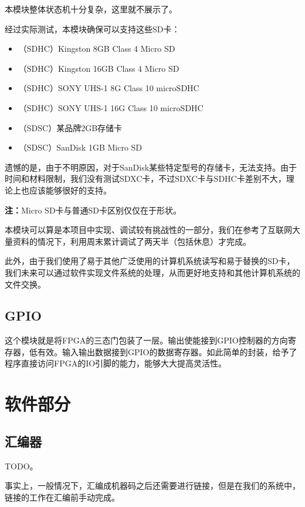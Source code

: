 \documentclass[11pt,utf8]{report}
\begin{document}
	\par 本模块整体状态机十分复杂，这里就不展示了。
	
	\par 经过实际测试，本模块确保可以支持这些SD卡：
	
	\begin{itemize}
		\item （SDHC）Kingston 8GB Class 4 Micro SD
		\item （SDHC）Kingston 16GB Class 4 Micro SD
		\item （SDHC）SONY UHS-1 8G Class 10 microSDHC
		\item （SDHC）SONY UHS-1 16G Class 10 microSDHC
		\item （SDSC）某品牌2GB存储卡
		\item （SDSC）SanDisk 1GB Micro SD
	\end{itemize}
	
	\par 遗憾的是，由于不明原因，对于SanDisk某些特定型号的存储卡，无法支持。由于时间和材料限制，我们没有测试SDXC卡，不过SDXC卡与SDHC卡差别不大，理论上也应该能够很好的支持。
	
	\par \textbf{注：}Micro SD卡与普通SD卡区别仅仅在于形状。
	
	\par 本模块可以算是本项目中实现、调试较有挑战性的一部分，我们在参考了互联网大量资料的情况下，利用周末累计调试了两天半（包括休息）才完成。
	\par 此外，由于我们使用了易于其他广泛使用的计算机系统读写和易于替换的SD卡，我们未来可以通过软件实现文件系统的处理，从而更好地支持和其他计算机系统的文件交换。

\subsection{GPIO}
	\par 这个模块就是将FPGA的三态门包装了一层。输出使能接到GPIO控制器的方向寄存器，低有效。输入输出数据接到GPIO的数据寄存器。如此简单的封装，给予了程序直接访问FPGA的IO引脚的能力，能够大大提高灵活性。

\section{软件部分}

\subsection{汇编器}
	\par TODO。
	\par 事实上，一般情况下，汇编成机器码之后还需要进行链接，但是在我们的系统中，链接的工作在汇编前手动完成。
	
\end{document}
